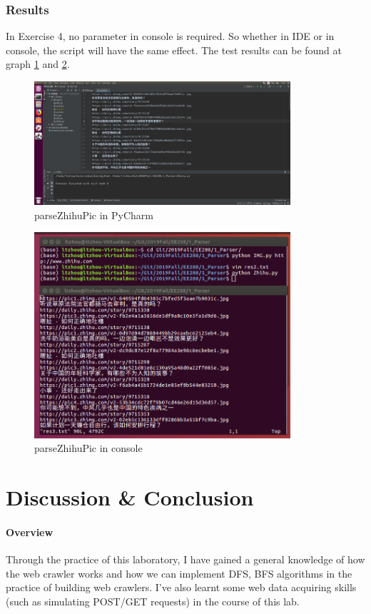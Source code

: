 \documentclass{article}
\begin{document}
\subsubsection{Results}

In Exercise 4, no parameter in console is required. So whether in IDE or in console, the script will have the same effect. The test results can be found at graph \ref{img:3.1} and \ref{img:3.2}.

\begin{figure}[htbp]
\centering
\includegraphics[width=9.5cm]{img/test3_1.png}
\caption{parseZhihuPic in PyCharm}
\label{img:3.1}
\end{figure}

\begin{figure}[htbp]
\centering
\includegraphics[width=9.5cm]{img/test3_2.png}
\caption{parseZhihuPic in console}
\label{img:3.2}
\end{figure}

\section{Discussion \& Conclusion}
\paragraph{Overview}
Through the practice of this laboratory, I have gained a general knowledge of how the web crawler works and how we can implement DFS, BFS algorithms in the practice of building web crawlers. I've also learnt some web data acquiring skills (such as simulating POST/GET requests) in the course of this lab.
\end{document}
